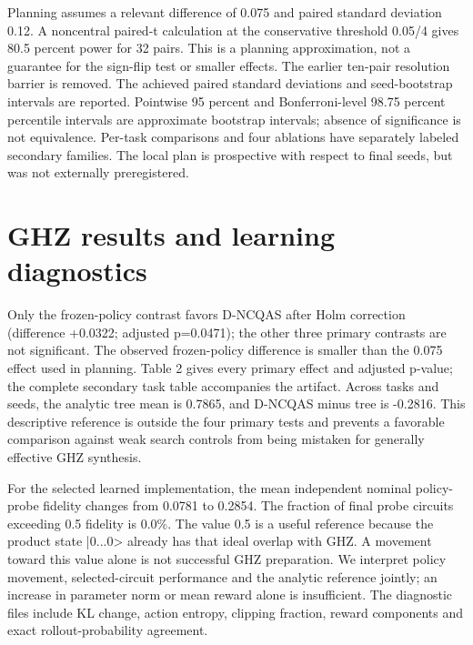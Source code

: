 \documentclass[11pt]{article}
\begin{document}
Planning assumes a relevant difference of 0.075 and paired standard deviation 0.12. A noncentral paired-t calculation at the conservative threshold 0.05/4 gives 80.5 percent power for 32 pairs. This is a planning approximation, not a guarantee for the sign-flip test or smaller effects. The earlier ten-pair resolution barrier is removed. The achieved paired standard deviations and seed-bootstrap intervals are reported. Pointwise 95 percent and Bonferroni-level 98.75 percent percentile intervals are approximate bootstrap intervals; absence of significance is not equivalence. Per-task comparisons and four ablations have separately labeled secondary families. The local plan is prospective with respect to final seeds, but was not externally preregistered.

\section{GHZ results and learning diagnostics}
Only the frozen-policy contrast favors D-NCQAS after Holm correction (difference +0.0322; adjusted p=0.0471); the other three primary contrasts are not significant. The observed frozen-policy difference is smaller than the 0.075 effect used in planning. Table 2 gives every primary effect and adjusted p-value; the complete secondary task table accompanies the artifact. Across tasks and seeds, the analytic tree mean is 0.7865, and D-NCQAS minus tree is -0.2816. This descriptive reference is outside the four primary tests and prevents a favorable comparison against weak search controls from being mistaken for generally effective GHZ synthesis.

For the selected learned implementation, the mean independent nominal policy-probe fidelity changes from 0.0781 to 0.2854. The fraction of final probe circuits exceeding 0.5 fidelity is 0.0\%. The value 0.5 is a useful reference because the product state |0...0> already has that ideal overlap with GHZ. A movement toward this value alone is not successful GHZ preparation. We interpret policy movement, selected-circuit performance and the analytic reference jointly; an increase in parameter norm or mean reward alone is insufficient. The diagnostic files include KL change, action entropy, clipping fraction, reward components and exact rollout-probability agreement.
\end{document}
